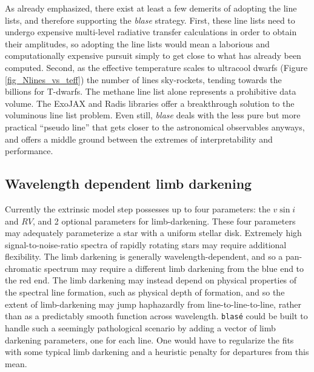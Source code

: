 \documentclass[twocolumn]{aastex631}
\begin{document}
As already emphasized, there exist at least a few demerits of adopting the line lists, and therefore supporting the \emph{blase} strategy.  First, these line lists need to undergo expensive multi-level radiative transfer calculations in order to obtain their amplitudes, so adopting the line lists would mean a laborious and computationally expensive pursuit simply to get close to what has already been computed.  Second, as the effective temperature scales to ultracool dwarfs (Figure \ref{fig_Nlines_vs_teff}) the number of lines sky-rockets, tending towards the billions for T-dwarfs.  The methane line list alone \citep{2020ApJS..247...55H} represents a prohibitive data volume.  The ExoJAX and Radis \citep{2019JQSRT.222...12P,2021JQSRT.26107476V} libraries offer a breakthrough solution to the voluminous line list problem.  Even still, \emph{blase} deals with the less pure but more practical ``pseudo line'' that gets closer to the astronomical observables anyways, and offers a middle ground between the extremes of interpretability and performance.

\subsection{Wavelength dependent limb darkening}
Currently the extrinsic model step possesses up to four parameters: the $v\sin{i}$ and $RV$, and 2 optional parameters for limb-darkening.  These four parameters may adequately parameterize a star with a uniform stellar disk.  Extremely high signal-to-noise-ratio spectra of rapidly rotating stars may require additional flexibility.  The limb darkening is generally wavelength-dependent, and so a pan-chromatic spectrum may require a different limb darkening from the blue end to the red end.  The limb darkening may instead depend on physical properties of the spectral line formation, such as physical depth of formation, and so the extent of limb-darkening may jump haphazardly from line-to-line-to-line, rather than as a predictably smooth function across wavelength.  \texttt{blas\'e} could be built to handle such a seemingly pathological scenario by adding a vector of limb darkening parameters, one for each line.  One would have to regularize the fits with some typical limb darkening and a heuristic penalty for departures from this mean.
\end{document}
